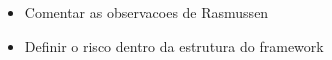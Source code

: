 \cite{riskoldschool}
\cite{safety}

\begin{itemize}
    \item Comentar as observacoes de Rasmussen
    \item Definir o risco dentro da estrutura do framework \cite{safety} 
\end{itemize}